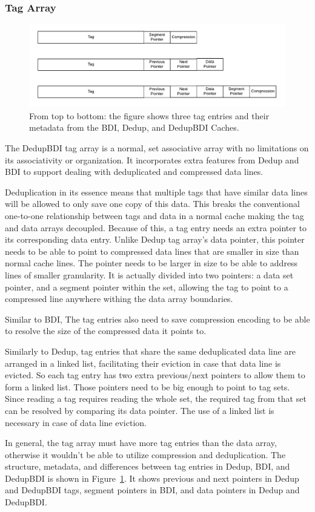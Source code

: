 \subsubsection{Tag Array}
\label{sssec:DedupBDITag}
\begin{figure}
    \includegraphics[width=\textwidth]{BDIvsDedupvsDedupBDI_Tag.pdf}
    \caption[DedupBDI Tag Array]{From top to bottom: the figure shows three tag entries and their metadata from the BDI, Dedup, and DedupBDI Caches.}
    \label{fig:DedupBDI_Tag}
\end{figure}
The DedupBDI tag array is a normal, set associative array with no limitations on its associativity or organization. It incorporates extra features from Dedup and BDI to support dealing with deduplicated and compressed data lines.\par
Deduplication in its essence means that multiple tags that have similar data lines will be allowed to only save one copy of this data. This breaks the conventional one-to-one relationship between tags and data in a normal cache making the tag and data arrays decoupled. Because of this, a tag entry needs an extra pointer to its corresponding data entry. Unlike Dedup tag array's data pointer, this pointer needs to be able to point to compressed data lines that are smaller in size than normal cache lines. The pointer needs to be larger in size to be able to address lines of smaller granularity. It is actually divided into two pointers: a data set pointer, and a segment pointer within the set, allowing the tag to point to a compressed line anywhere withing the data array boundaries.\par
Similar to BDI, The tag entries also need to save compression encoding to be able to resolve the size of the compressed data it points to.\par
Similarly to Dedup, tag entries that share the same deduplicated data line are arranged in a linked list, facilitating their eviction in case that data line is evicted. So each tag entry has two extra previous/next pointers to allow them to form a linked list. Those pointers need to be big enough to point to tag sets. Since reading a tag requires reading the whole set, the required tag from that set can be resolved by comparing its data pointer. The use of a linked list is necessary in case of data line eviction.\par
In general, the tag array must have more tag entries than the data array, otherwise it wouldn't be able to utilize compression and deduplication. The structure, metadata, and differences between tag entries in Dedup, BDI, and DedupBDI is shown in Figure~\ref{fig:DedupBDI_Tag}. It shows previous and next pointers in Dedup and DedupBDI tags, segment pointers in BDI, and data pointers in Dedup and DedupBDI.
